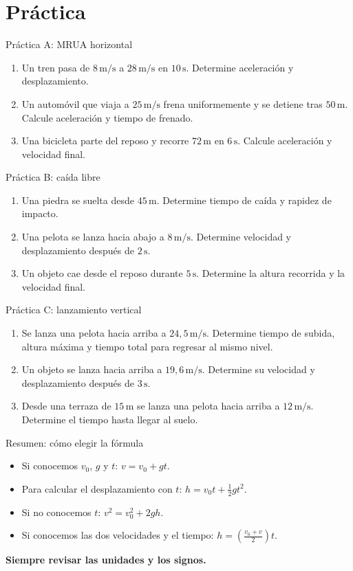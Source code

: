 \documentclass[aspectratio=169,10pt]{beamer}
\begin{document}
\section{Práctica}
\begin{frame}{Práctica A: MRUA horizontal}\begin{enumerate}\item Un tren pasa de $8\,\mathrm{m/s}$ a $28\,\mathrm{m/s}$ en $10\,\mathrm{s}$. Determine aceleración y desplazamiento.\medskip\item Un automóvil que viaja a $25\,\mathrm{m/s}$ frena uniformemente y se detiene tras $50\,\mathrm{m}$. Calcule aceleración y tiempo de frenado.\medskip\item Una bicicleta parte del reposo y recorre $72\,\mathrm{m}$ en $6\,\mathrm{s}$. Calcule aceleración y velocidad final.\end{enumerate}\end{frame}
\begin{frame}{Práctica B: caída libre}\begin{enumerate}\item Una piedra se suelta desde $45\,\mathrm{m}$. Determine tiempo de caída y rapidez de impacto.\medskip\item Una pelota se lanza hacia abajo a $8\,\mathrm{m/s}$. Determine velocidad y desplazamiento después de $2\,\mathrm{s}$.\medskip\item Un objeto cae desde el reposo durante $5\,\mathrm{s}$. Determine la altura recorrida y la velocidad final.\end{enumerate}\end{frame}
\begin{frame}{Práctica C: lanzamiento vertical}\begin{enumerate}\item Se lanza una pelota hacia arriba a $24,5\,\mathrm{m/s}$. Determine tiempo de subida, altura máxima y tiempo total para regresar al mismo nivel.\medskip\item Un objeto se lanza hacia arriba a $19,6\,\mathrm{m/s}$. Determine su velocidad y desplazamiento después de $3\,\mathrm{s}$.\medskip\item Desde una terraza de $15\,\mathrm{m}$ se lanza una pelota hacia arriba a $12\,\mathrm{m/s}$. Determine el tiempo hasta llegar al suelo.\end{enumerate}\end{frame}
\begin{frame}{Resumen: cómo elegir la fórmula}
\begin{itemize}
\item Si conocemos $v_0$, $g$ y $t$: $v=v_0+gt$.
\item Para calcular el desplazamiento con $t$: $h=v_0t+\frac12 gt^2$.
\item Si no conocemos $t$: $v^2=v_0^2+2gh$.
\item Si conocemos las dos velocidades y el tiempo: $h=\left(\frac{v_0+v}{2}\right)t$.
\end{itemize}
\vspace{5mm}\centering\color{morado}\bfseries Siempre revisar las unidades y los signos.\end{frame}
\end{document}
